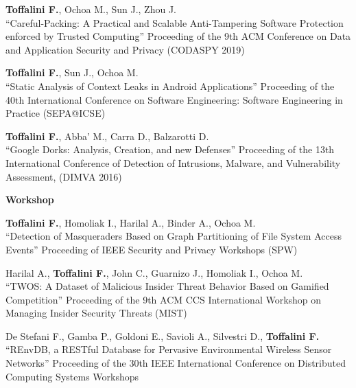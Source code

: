 \begin{enumerate}[label={[C\arabic*]},leftmargin=5mm]
\item \textbf{Toffalini F.}, Ochoa M., Sun J., Zhou J.\\``Careful-Packing: A Practical and Scalable Anti-Tampering Software Protection enforced by Trusted Computing'' Proceeding of the 9th ACM Conference on Data and Application Security and Privacy (CODASPY 2019)
\item \textbf{Toffalini F.}, Sun J., Ochoa M.\\``Static Analysis of Context Leaks in Android Applications'' Proceeding of the 40th International Conference on Software Engineering: Software Engineering in Practice (SEPA@ICSE)
\item \textbf{Toffalini F.}, Abba' M., Carra D., Balzarotti D.\\``Google Dorks: Analysis, Creation, and new Defenses'' Proceeding of the 13th International Conference of Detection of Intrusions, Malware, and Vulnerability Assessment, (DIMVA 2016)
\end{enumerate}
\textbf{Workshop}\begin{enumerate}[label={[W\arabic*]},leftmargin=5mm]
\item \textbf{Toffalini F.}, Homoliak I., Harilal A., Binder A., Ochoa M.\\``Detection of Masqueraders Based on Graph Partitioning of File System Access Events'' Proceeding of IEEE Security and Privacy Workshops (SPW)
\item Harilal A., \textbf{Toffalini F.}, John C., Guarnizo J., Homoliak I., Ochoa M.\\``TWOS: A Dataset of Malicious Insider Threat Behavior Based on Gamified Competition'' Proceeding of the 9th ACM CCS International Workshop on Managing Insider Security Threats (MIST)
\item De Stefani F., Gamba P., Goldoni E., Savioli A., Silvestri D., \textbf{Toffalini F.}\\``REnvDB, a RESTful Database for Pervasive Environmental Wireless Sensor Networks'' Proceeding of the 30th IEEE International Conference on Distributed Computing Systems Workshops
\end{enumerate}
